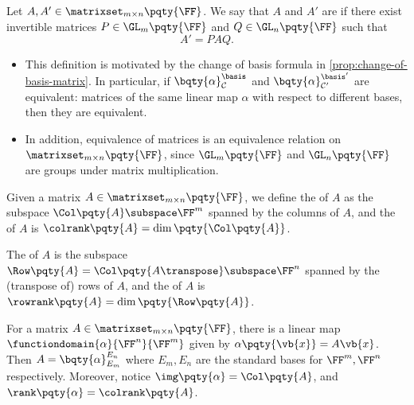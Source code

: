 \begin{definition}
    Let \(A, A' \in \matrixset_{m \times n} \pqty{\FF}\). We say that \(A\) and \(A'\) are  if there exist invertible matrices \(P \in \GL_m\pqty{\FF}\) and \(Q \in \GL_n\pqty{\FF}\) such that
    \[
        A' = P A Q.
    \]
\end{definition}

\begin{remarks}
    \begin{itemize}
        \item This definition is motivated by the change of basis formula in \autoref{prop:change-of-basis-matrix}. In particular, if \(\bqty{\alpha}_{\mathcal{C}}^{\basis}\) and \(\bqty{\alpha}_{\mathcal{C}'}^{\basis'}\) are equivalent: matrices of the same linear map \(\alpha\) with respect to different bases, then they are equivalent.
        \item In addition, equivalence of matrices is an equivalence relation on \(\matrixset_{m \times n} \pqty{\FF}\), since \(\GL_m\pqty{\FF}\) and \(\GL_n\pqty{\FF}\) are groups under matrix multiplication.
    \end{itemize}
\end{remarks}

\begin{definition}
    Given a matrix \(A \in \matrixset_{m \times n} \pqty{\FF}\), we define the  of \(A\) as the subspace \(\Col\pqty{A} \subspace \FF^m\) spanned by the columns of \(A\), and the  of \(A\) is \(\colrank\pqty{A} = \dim\pqty{\Col\pqty{A}}\).
    
    The  of \(A\) is the subspace \(\Row\pqty{A} = \Col\pqty{A \transpose} \subspace \FF^n\) spanned by the (transpose of) rows of \(A\), and the  of \(A\) is \(\rowrank\pqty{A} = \dim\pqty{\Row\pqty{A}}\).
\end{definition}

\begin{remark}
    For a matrix \(A \in \matrixset_{m \times n} \pqty{\FF}\), there is a linear map \(\functiondomain{\alpha}{\FF^n}{\FF^m}\) given by \(\alpha\pqty{\vb{x}} = A \vb{x}\). Then \(A = \bqty{\alpha}_{E_m}^{E_n}\) where \(E_m, E_n\) are the standard bases for \(\FF^m, \FF^n\) respectively. Moreover, notice \(\img\pqty{\alpha} = \Col\pqty{A}\), and \(\rank\pqty{\alpha} = \colrank\pqty{A}\).
\end{remark}

